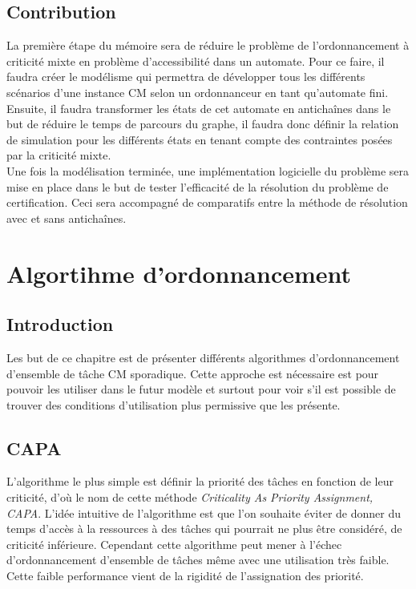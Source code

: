 \documentclass[12pt,a4paper,oneside]{book}
\theoremstyle{break}
\theoremstyle{breakplain}
\begin{document}
\section{Contribution}

La première étape du mémoire sera de réduire le problème de l'ordonnancement à criticité mixte en problème d'accessibilité dans un automate. Pour ce faire, il faudra créer le modélisme qui permettra de développer tous les différents scénarios d'une instance CM selon un ordonnanceur en tant qu'automate fini.\\

Ensuite, il faudra transformer les états de cet automate en antichaînes dans le but de réduire le temps de parcours du graphe, il faudra donc définir la relation de simulation pour les différents états en tenant compte des contraintes posées par la criticité mixte.\\

Une fois la modélisation terminée, une implémentation logicielle du problème sera mise en place dans le but de tester l'efficacité de la résolution du problème de certification. Ceci sera accompagné de comparatifs entre la méthode de résolution avec et sans antichaînes.



\chapter{Algortihme d'ordonnancement}
\section{Introduction}
Les but de ce chapitre est de présenter différents algorithmes d'ordonnancement d'ensemble de tâche CM sporadique. Cette approche est nécessaire est pour pouvoir les utiliser dans le futur modèle et surtout pour voir s'il est possible de trouver des conditions d'utilisation plus permissive que les présente.

\section{CAPA}

L'algorithme le plus simple est définir la priorité des tâches en fonction de leur criticité, d'où le nom de cette méthode \textit{Criticality As Priority Assignment, CAPA}. L'idée intuitive de l'algorithme est que l'on souhaite éviter de donner du temps d'accès à la ressources à des tâches qui pourrait ne plus être considéré, de criticité inférieure. Cependant cette algorithme peut mener à l'échec d'ordonnancement d'ensemble de tâches même avec une utilisation très faible. Cette faible performance vient de la rigidité de l'assignation des priorité.\cite{de2009scheduling} 
\end{document}
